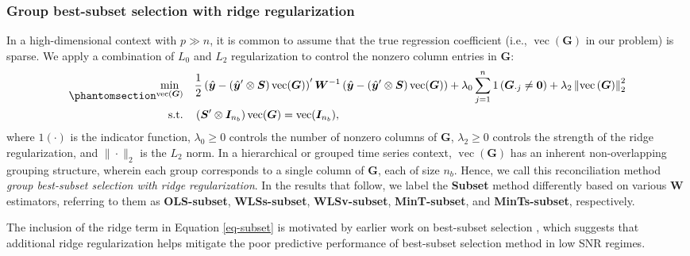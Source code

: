 \documentclass[
  11pt]{article}
\theoremstyle{plain}
\theoremstyle{remark}
\begin{document}
\subsubsection*{Group best-subset selection with ridge
regularization}\label{group-best-subset-selection-with-ridge-regularization}

In a high-dimensional context with \(p \gg n\), it is common to assume
that the true regression coefficient (i.e.,
\(\operatorname{vec}(\bm{G})\) in our problem) is sparse. We apply a
combination of \(L_0\) and \(L_2\) regularization to control the nonzero
column entries in \(\bm{G}\):
\begin{equation}\phantomsection\label{eq-subset}{ \begin{aligned}
\min_{\operatorname{vec}(\bm{G})} \quad & \frac{1}{2}\left(\hat{\bm{y}}-\left(\hat{\bm{y}}^{\prime} \otimes \bm{S}\right) \operatorname{vec}(\bm{G})\right)^{\prime} \bm{W}^{-1}\left(\hat{\bm{y}}-\left(\hat{\bm{y}}^{\prime} \otimes \bm{S}\right) \operatorname{vec}(\bm{G})\right) + \lambda_0 \sum_{j=1}^n 1\left(\bm{G}_{\cdot j} \neq \bm{0}\right) + \lambda_2 \left\|\operatorname{vec}\left(\bm{G}\right)\right\|_2^2 \\
\text{s.t.} \quad & \left(\bm{S}^{\prime} \otimes \bm{I}_{n_b}\right) \operatorname{vec}(\bm{G})=\operatorname{vec}(\bm{I}_{n_b}),
\end{aligned}
}\end{equation} where \(1(\cdot)\) is the indicator function,
\(\lambda_0 \geq 0\) controls the number of nonzero columns of
\(\bm{G}\), \(\lambda_2 \geq 0\) controls the strength of the ridge
regularization, and \(\|\cdot\|_2\) is the \(L_2\) norm. In a
hierarchical or grouped time series context,
\(\operatorname{vec}(\bm{G})\) has an inherent non-overlapping grouping
structure, wherein each group corresponds to a single column of
\(\bm{G}\), each of size \(n_b\). Hence, we call this reconciliation
method \emph{group best-subset selection with ridge regularization}. In
the results that follow, we label the \textbf{Subset} method differently
based on various \(\bm{W}\) estimators, referring to them as
\textbf{OLS-subset}, \textbf{WLSs-subset}, \textbf{WLSv-subset},
\textbf{MinT-subset}, and \textbf{MinTs-subset}, respectively.

The inclusion of the ridge term in Equation \eqref{eq-subset} is
motivated by earlier work on best-subset selection
\citep[e.g.,][]{Hazimeh2020-xd, Mazumder2022-hx}, which suggests that
additional ridge regularization helps mitigate the poor predictive
performance of best-subset selection method in low SNR regimes.
\end{document}
